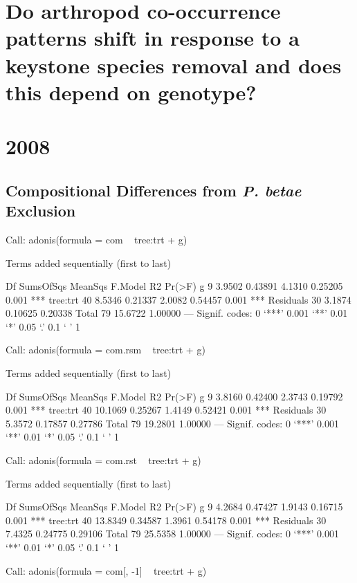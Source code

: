 \documentclass[12pt]{article}
\begin{document}
\section{Do arthropod co-occurrence patterns shift in response to a
  keystone species removal and does this depend on genotype?}

\section{2008}




\subsection{Compositional Differences from \textit{P. betae} Exclusion}

\begin{Schunk}
\begin{Soutput}
Call:
adonis(formula = com ~ tree:trt + g) 

Terms added sequentially (first to last)

          Df SumsOfSqs MeanSqs F.Model      R2 Pr(>F)    
g          9    3.9502 0.43891  4.1310 0.25205  0.001 ***
tree:trt  40    8.5346 0.21337  2.0082 0.54457  0.001 ***
Residuals 30    3.1874 0.10625         0.20338           
Total     79   15.6722                 1.00000           
---
Signif. codes:  0 ‘***’ 0.001 ‘**’ 0.01 ‘*’ 0.05 ‘.’ 0.1 ‘ ’ 1 
\end{Soutput}
\begin{Soutput}
Call:
adonis(formula = com.rsm ~ tree:trt + g) 

Terms added sequentially (first to last)

          Df SumsOfSqs MeanSqs F.Model      R2 Pr(>F)    
g          9    3.8160 0.42400  2.3743 0.19792  0.001 ***
tree:trt  40   10.1069 0.25267  1.4149 0.52421  0.001 ***
Residuals 30    5.3572 0.17857         0.27786           
Total     79   19.2801                 1.00000           
---
Signif. codes:  0 ‘***’ 0.001 ‘**’ 0.01 ‘*’ 0.05 ‘.’ 0.1 ‘ ’ 1 
\end{Soutput}
\begin{Soutput}
Call:
adonis(formula = com.rst ~ tree:trt + g) 

Terms added sequentially (first to last)

          Df SumsOfSqs MeanSqs F.Model      R2 Pr(>F)    
g          9    4.2684 0.47427  1.9143 0.16715  0.001 ***
tree:trt  40   13.8349 0.34587  1.3961 0.54178  0.001 ***
Residuals 30    7.4325 0.24775         0.29106           
Total     79   25.5358                 1.00000           
---
Signif. codes:  0 ‘***’ 0.001 ‘**’ 0.01 ‘*’ 0.05 ‘.’ 0.1 ‘ ’ 1 
\end{Soutput}
\begin{Soutput}
Call:
adonis(formula = com[, -1] ~ tree:trt + g) 


\end{Soutput}
\end{Schunk}
\end{document}
